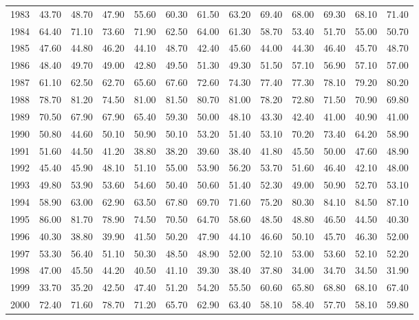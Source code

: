 \begin{longtable}{rrrrrrrrrrrrr}
  1983 & 43.70 & 48.70 & 47.90 & 55.60 & 60.30 & 61.50 & 63.20 & 69.40 & 68.00 & 69.30 & 68.10 & 71.40 \\ 
  1984 & 64.40 & 71.10 & 73.60 & 71.90 & 62.50 & 64.00 & 61.30 & 58.70 & 53.40 & 51.70 & 55.00 & 50.70 \\ 
  1985 & 47.60 & 44.80 & 46.20 & 44.10 & 48.70 & 42.40 & 45.60 & 44.00 & 44.30 & 46.40 & 45.70 & 48.70 \\ 
  1986 & 48.40 & 49.70 & 49.00 & 42.80 & 49.50 & 51.30 & 49.30 & 51.50 & 57.10 & 56.90 & 57.10 & 57.00 \\ 
  1987 & 61.10 & 62.50 & 62.70 & 65.60 & 67.60 & 72.60 & 74.30 & 77.40 & 77.30 & 78.10 & 79.20 & 80.20 \\ 
  1988 & 78.70 & 81.20 & 74.50 & 81.00 & 81.50 & 80.70 & 81.00 & 78.20 & 72.80 & 71.50 & 70.90 & 69.80 \\ 
  1989 & 70.50 & 67.90 & 67.90 & 65.40 & 59.30 & 50.00 & 48.10 & 43.30 & 42.40 & 41.00 & 40.90 & 41.00 \\ 
  1990 & 50.80 & 44.60 & 50.10 & 50.90 & 50.10 & 53.20 & 51.40 & 53.10 & 70.20 & 73.40 & 64.20 & 58.90 \\ 
  1991 & 51.60 & 44.50 & 41.20 & 38.80 & 38.20 & 39.60 & 38.40 & 41.80 & 45.50 & 50.00 & 47.60 & 48.90 \\ 
  1992 & 45.40 & 45.90 & 48.10 & 51.10 & 55.00 & 53.90 & 56.20 & 53.70 & 51.60 & 46.40 & 42.10 & 48.00 \\ 
  1993 & 49.80 & 53.90 & 53.60 & 54.60 & 50.40 & 50.60 & 51.40 & 52.30 & 49.00 & 50.90 & 52.70 & 53.10 \\ 
  1994 & 58.90 & 63.00 & 62.90 & 63.50 & 67.80 & 69.70 & 71.60 & 75.20 & 80.30 & 84.10 & 84.50 & 87.10 \\ 
  1995 & 86.00 & 81.70 & 78.90 & 74.50 & 70.50 & 64.70 & 58.60 & 48.50 & 48.80 & 46.50 & 44.50 & 40.30 \\ 
  1996 & 40.30 & 38.80 & 39.90 & 41.50 & 50.20 & 47.90 & 44.10 & 46.60 & 50.10 & 45.70 & 46.30 & 52.00 \\ 
  1997 & 53.30 & 56.40 & 51.10 & 50.30 & 48.50 & 48.90 & 52.00 & 52.10 & 53.00 & 53.60 & 52.10 & 52.20 \\ 
  1998 & 47.00 & 45.50 & 44.20 & 40.50 & 41.10 & 39.30 & 38.40 & 37.80 & 34.00 & 34.70 & 34.50 & 31.90 \\ 
  1999 & 33.70 & 35.20 & 42.50 & 47.40 & 51.20 & 54.20 & 55.50 & 60.60 & 65.80 & 68.80 & 68.10 & 67.40 \\ 
  2000 & 72.40 & 71.60 & 78.70 & 71.20 & 65.70 & 62.90 & 63.40 & 58.10 & 58.40 & 57.70 & 58.10 & 59.80 \\ 

\end{longtable}
